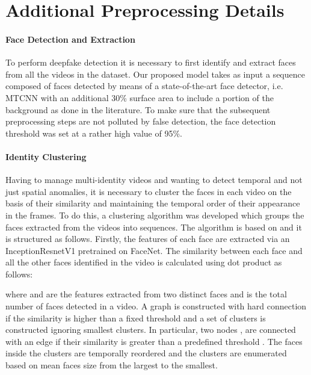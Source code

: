\documentclass[10pt,twocolumn,letterpaper]{article}
\begin{document}
{\small
\balance


}




\appendix
\section{Additional Preprocessing Details}
\paragraph{Face Detection and Extraction} To perform deepfake detection it is necessary to first identify and extract faces from all the videos in the dataset. Our proposed model takes as input a sequence composed of faces detected by means of a state-of-the-art face detector, i.e. MTCNN\cite{mtcnn} with an additional 30\% surface area to include a portion of the background as done in the literature\cite{10.1007/978-3-031-06433-3_19, meverdeepfake}.
To make sure that the subsequent preprocessing steps are not polluted by false detection, the face detection threshold was set at a rather high value of 95\%.
\paragraph{Identity Clustering} Having to manage multi-identity videos and wanting to detect temporal and not just spatial anomalies, it is necessary to cluster the faces in each video on the basis of their similarity and maintaining the temporal order of their appearance in the frames. To do this, a clustering algorithm was developed which groups the faces extracted from the videos into sequences. 
The algorithm is based on \cite{preprocessing} and it is structured as follows. Firstly, the features of each face are extracted via an InceptionResnetV1 pretrained on FaceNet\cite{facenet}. The similarity  between each face and all the other faces identified in the video is calculated using dot product as follows:

where  and  are the features extracted from two distinct faces and  is the total number of faces detected in a video.
A graph is constructed with hard connection if the similarity is higher than a fixed threshold and a set of clusters is constructed ignoring smallest clusters. In particular, two nodes ,  are connected with an edge if their similarity is greater than a predefined threshold \cite{preprocessing}. The faces inside the clusters are temporally reordered and the clusters are enumerated based on mean faces size from the largest to the smallest.
\end{document}
